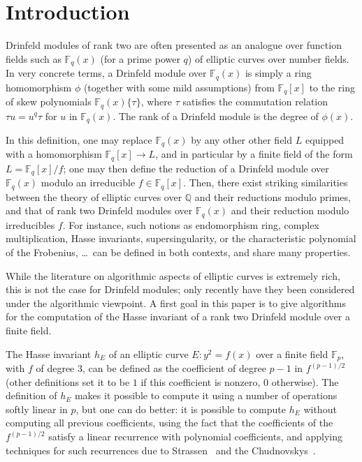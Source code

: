 \documentclass[12pt]{article}
\theoremstyle{plain}
\theoremstyle{definition}
\newcommand{\ang}[1]{\{#1\}}
\def\Q{\ensuremath{\mathbb{Q}}}
\def\F{\ensuremath{\mathbb{F}}}
\begin{document}
\section{Introduction}

Drinfeld modules of rank two are often presented as an analogue over
function fields such as $\F_q(x)$ (for a prime power $q$) of elliptic
curves over number fields. In very concrete terms, a Drinfeld module
over $\F_q(x)$ is simply a ring homomorphism $\phi$ (together with
some mild assumptions) from $\F_q[x]$ to the ring of skew polynomials
$\F_q(x)\ang{\tau}$, where $\tau$ satisfies the commutation
relation $\tau u = u^q \tau$ for $u$ in $\F_q(x)$. The rank of a
Drinfeld module is the degree of $\phi(x)$.

In this definition, one may replace $\F_q(x)$ by any other other field
$L$ equipped with a homomorphism $\F_q[x]\to L$, and in particular by
a finite field of the form $L=\F_q[x]/f$; one may then define the {\rm
  reduction} of a Drinfeld module over $\F_q(x)$ modulo an irreducible
$f \in \F_q[x]$. Then, there exist striking similarities between the
theory of elliptic curves over $\Q$ and their reductions modulo primes,
and that of rank two Drinfeld modules over $\F_q(x)$ and their
reduction modulo irreducibles $f$. For instance, such notions as
endomorphism ring, complex multiplication, Hasse invariants,
supersingularity, or the characteristic polynomial of the Frobenius,
\dots~can be defined in both contexts, and share many
properties.

While the literature on algorithmic aspects of elliptic curves is
extremely rich, this is not the case for Drinfeld modules; only
recently have they been considered under the algorithmic viewpoint.  A
first goal in this paper is to give algorithms for the computation of
the Hasse invariant of a rank two Drinfeld module over a finite field.

The Hasse invariant $h_E$ of an elliptic curve $E: y^2=f(x)$ over a
finite field $\F_p$, with $f$ of degree $3$, can be defined as the
coefficient of degree $p-1$ in $f^{(p-1)/2}$ (other definitions set it
to be $1$ if this coefficient is nonzero, $0$ otherwise). The
definition of $h_E$ makes it possible to compute it using a number of
operations softly linear in $p$, but one can do better: it is possible
to compute $h_E$ without computing all previous coefficients, using
the fact that the coefficients of the $f^{(p-1)/2}$ satisfy a linear
recurrence with polynomial coefficients, and applying techniques for
such recurrences due to Strassen~\cite{Strassen76} and the
Chudnovskys~\cite{ChCh88}.
\end{document}
